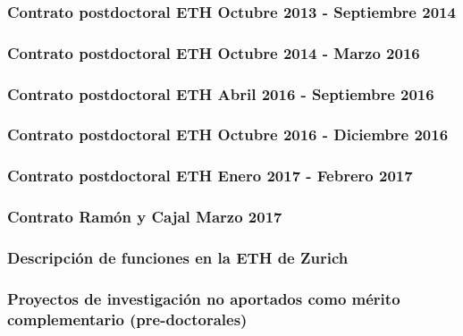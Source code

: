 \documentclass[a4paper, 11pt, twoside, openright]{report}
\begin{document}
\subsubsection{Contrato postdoctoral ETH Octubre 2013 - Septiembre 2014}


\subsubsection{Contrato postdoctoral ETH Octubre 2014 - Marzo 2016}


\subsubsection{Contrato postdoctoral ETH Abril 2016 - Septiembre 2016}


\subsubsection{Contrato postdoctoral ETH Octubre 2016 - Diciembre 2016}


\subsubsection{Contrato postdoctoral ETH Enero 2017 - Febrero 2017}


\subsubsection{Contrato Ramón y Cajal Marzo 2017}


\subsubsection{Descripción de funciones en la ETH de Zurich}


\subsubsection{Proyectos de investigación no aportados como mérito complementario (pre-doctorales)}
\end{document}
